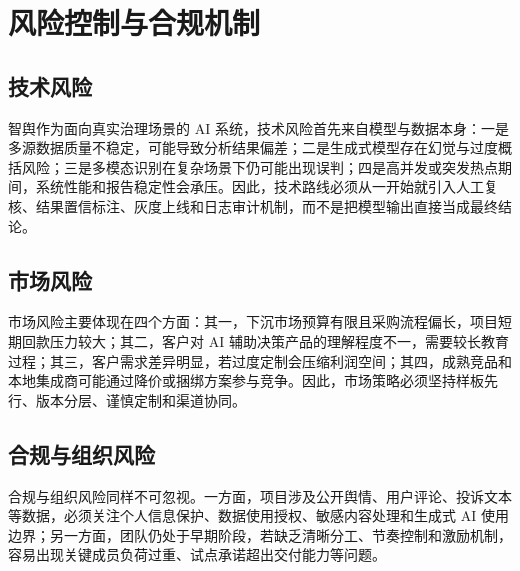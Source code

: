 \chapter{风险控制与合规机制}

\section{技术风险}

智舆作为面向真实治理场景的 AI 系统，技术风险首先来自模型与数据本身：一是多源数据质量不稳定，可能导致分析结果偏差；二是生成式模型存在幻觉与过度概括风险；三是多模态识别在复杂场景下仍可能出现误判；四是高并发或突发热点期间，系统性能和报告稳定性会承压。因此，技术路线必须从一开始就引入人工复核、结果置信标注、灰度上线和日志审计机制，而不是把模型输出直接当成最终结论。

\section{市场风险}

市场风险主要体现在四个方面：其一，下沉市场预算有限且采购流程偏长，项目短期回款压力较大；其二，客户对 AI 辅助决策产品的理解程度不一，需要较长教育过程；其三，客户需求差异明显，若过度定制会压缩利润空间；其四，成熟竞品和本地集成商可能通过降价或捆绑方案参与竞争。因此，市场策略必须坚持样板先行、版本分层、谨慎定制和渠道协同。

\section{合规与组织风险}

合规与组织风险同样不可忽视。一方面，项目涉及公开舆情、用户评论、投诉文本等数据，必须关注个人信息保护、数据使用授权、敏感内容处理和生成式 AI 使用边界；另一方面，团队仍处于早期阶段，若缺乏清晰分工、节奏控制和激励机制，容易出现关键成员负荷过重、试点承诺超出交付能力等问题。

